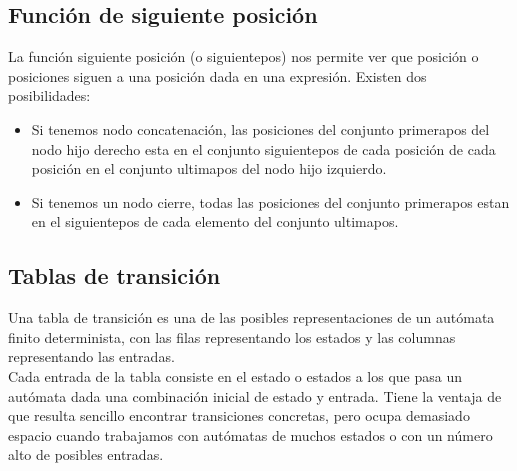 \subsection{Función de siguiente posición}
La función siguiente posición (o siguientepos) nos permite ver que posición o posiciones siguen a una posición dada en una expresión.
Existen dos posibilidades:
\begin{itemize}
	\item Si tenemos nodo concatenación, las posiciones del conjunto primerapos del nodo hijo derecho esta en el conjunto siguientepos de cada posición de cada posición en el conjunto ultimapos del nodo hijo izquierdo.
	\item Si tenemos un nodo cierre, todas las posiciones del conjunto primerapos estan en el siguientepos de cada elemento del conjunto ultimapos.
\end{itemize}

\subsection{Tablas de transición}
Una tabla de transición es una de las posibles representaciones de un autómata finito determinista, con las filas representando los estados y las columnas representando las entradas.
\\
Cada entrada de la tabla consiste en el estado o estados a los que pasa un autómata dada una combinación inicial de estado y entrada.
Tiene la ventaja de que resulta sencillo encontrar transiciones concretas, pero ocupa demasiado espacio cuando trabajamos con autómatas de muchos estados o con un número alto de posibles entradas.
